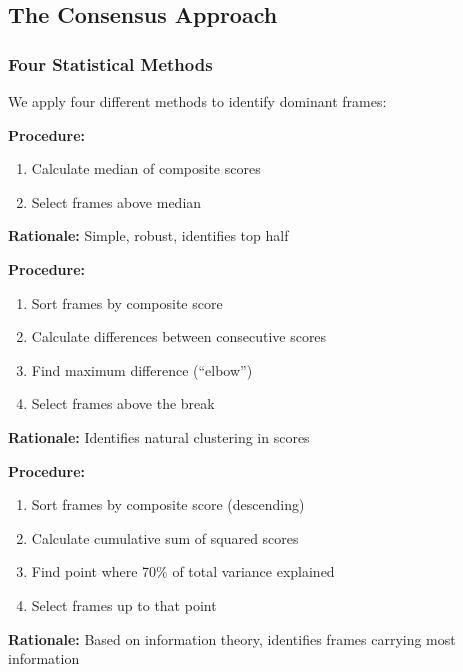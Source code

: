 \documentclass[11pt]{article}
\begin{document}
\subsection{The Consensus Approach}

\subsubsection{Four Statistical Methods}

We apply four different methods to identify dominant frames:

\begin{tcolorbox}[mybox={Method 1: Above Median}]
\textbf{Procedure:}
\begin{enumerate}
    \item Calculate median of composite scores
    \item Select frames above median
\end{enumerate}

\textbf{Rationale:} Simple, robust, identifies top half
\end{tcolorbox}

\begin{tcolorbox}[mybox={Method 2: Natural Break (Elbow Method)}]
\textbf{Procedure:}
\begin{enumerate}
    \item Sort frames by composite score
    \item Calculate differences between consecutive scores
    \item Find maximum difference (``elbow'')
    \item Select frames above the break
\end{enumerate}

\textbf{Rationale:} Identifies natural clustering in scores
\end{tcolorbox}

\begin{tcolorbox}[mybox={Method 3: Cumulative Variance}]
\textbf{Procedure:}
\begin{enumerate}
    \item Sort frames by composite score (descending)
    \item Calculate cumulative sum of squared scores
    \item Find point where 70\% of total variance explained
    \item Select frames up to that point
\end{enumerate}

\textbf{Rationale:} Based on information theory, identifies frames carrying most information
\end{tcolorbox}
\end{document}
